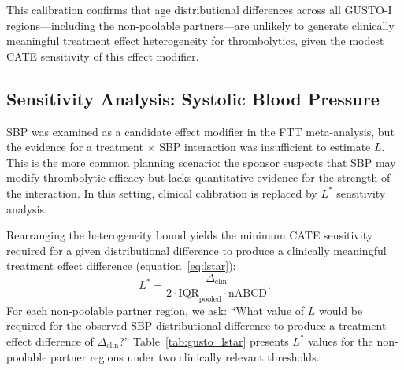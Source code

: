 This calibration confirms that age distributional differences across all GUSTO-I regions---including the non-poolable partners---are unlikely to generate clinically meaningful treatment effect heterogeneity for thrombolytics, given the modest CATE sensitivity of this effect modifier.

\subsection{Sensitivity Analysis: Systolic Blood Pressure}\label{sec:app_sbp_sensitivity}

SBP was examined as a candidate effect modifier in the FTT meta-analysis,\cite{ftt1994} but the evidence for a treatment $\times$ SBP interaction was insufficient to estimate $L$. This is the more common planning scenario: the sponsor suspects that SBP may modify thrombolytic efficacy but lacks quantitative evidence for the strength of the interaction. In this setting, clinical calibration is replaced by $L^*$ sensitivity analysis.

Rearranging the heterogeneity bound yields the minimum CATE sensitivity required for a given distributional difference to produce a clinically meaningful treatment effect difference (equation~\ref{eq:lstar}):
\[
L^* = \frac{\Delta_{\text{clin}}}{2 \cdot \text{IQR}_{\text{pooled}} \cdot \text{nABCD}}.
\]
For each non-poolable partner region, we ask: ``What value of $L$ would be required for the observed SBP distributional difference to produce a treatment effect difference of $\Delta_{\text{clin}}$?'' Table~\ref{tab:gusto_lstar} presents $L^*$ values for the non-poolable partner regions under two clinically relevant thresholds.

